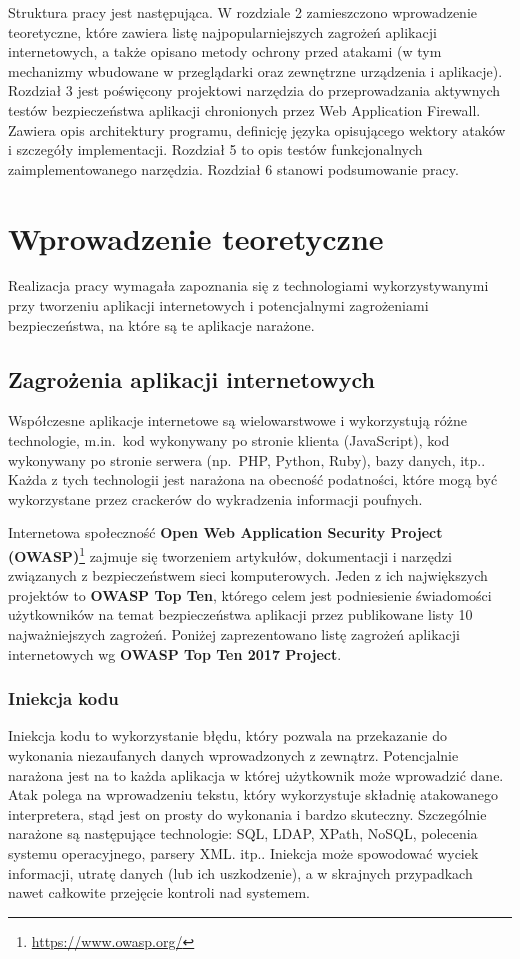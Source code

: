 \documentclass[11pt,a4paper,polish,thesis]{dcsbook}
\begin{document}
Struktura pracy jest następująca. W rozdziale 2 zamieszczono wprowadzenie teoretyczne, które zawiera listę najpopularniejszych zagrożeń aplikacji internetowych, a także opisano metody ochrony przed atakami (w tym mechanizmy wbudowane w przeglądarki oraz zewnętrzne urządzenia i aplikacje). Rozdział 3 jest poświęcony projektowi narzędzia do przeprowadzania aktywnych testów bezpieczeństwa aplikacji chronionych przez Web Application Firewall. Zawiera opis architektury programu, definicję języka opisującego wektory ataków i szczegóły implementacji. Rozdział 5 to opis testów funkcjonalnych zaimplementowanego narzędzia. Rozdział 6 stanowi podsumowanie pracy.


\chapter{Wprowadzenie teoretyczne}
Realizacja pracy wymagała zapoznania się z technologiami wykorzystywanymi przy tworzeniu aplikacji internetowych i potencjalnymi zagrożeniami bezpieczeństwa, na które są te aplikacje narażone.
\section{Zagrożenia aplikacji internetowych}
Współczesne aplikacje internetowe są wielowarstwowe i wykorzystują różne technologie, m.in.~kod wykonywany po stronie klienta (JavaScript), kod wykonywany po stronie serwera (np.~PHP, Python, Ruby), bazy danych, itp.. Każda z tych technologii jest narażona na obecność podatności, które mogą być wykorzystane przez crackerów do wykradzenia informacji poufnych.

Internetowa społeczność \textbf{Open Web Application Security Project (OWASP)}\footnote{\url{ https://www.owasp.org/}} zajmuje się tworzeniem artykułów, dokumentacji i narzędzi związanych z bezpieczeństwem sieci komputerowych. Jeden z ich największych projektów to \textbf{OWASP Top Ten}, którego celem jest podniesienie świadomości użytkowników na temat bezpieczeństwa aplikacji przez publikowane listy 10 najważniejszych zagrożeń. Poniżej zaprezentowano listę zagrożeń aplikacji internetowych wg \textbf{OWASP Top Ten 2017 Project}.

\subsection{Iniekcja kodu}
Iniekcja kodu to wykorzystanie błędu, który pozwala na przekazanie do wykonania niezaufanych danych wprowadzonych z zewnątrz. Potencjalnie narażona jest na to każda aplikacja w której użytkownik może wprowadzić dane. Atak polega na wprowadzeniu tekstu, który wykorzystuje składnię atakowanego interpretera, stąd jest on prosty do wykonania i bardzo skuteczny. Szczególnie narażone są następujące technologie: SQL, LDAP, XPath, NoSQL, polecenia systemu operacyjnego, parsery XML. itp.. Iniekcja może spowodować wyciek informacji, utratę danych (lub ich uszkodzenie), a w skrajnych przypadkach nawet całkowite przejęcie kontroli nad systemem.
\end{document}
